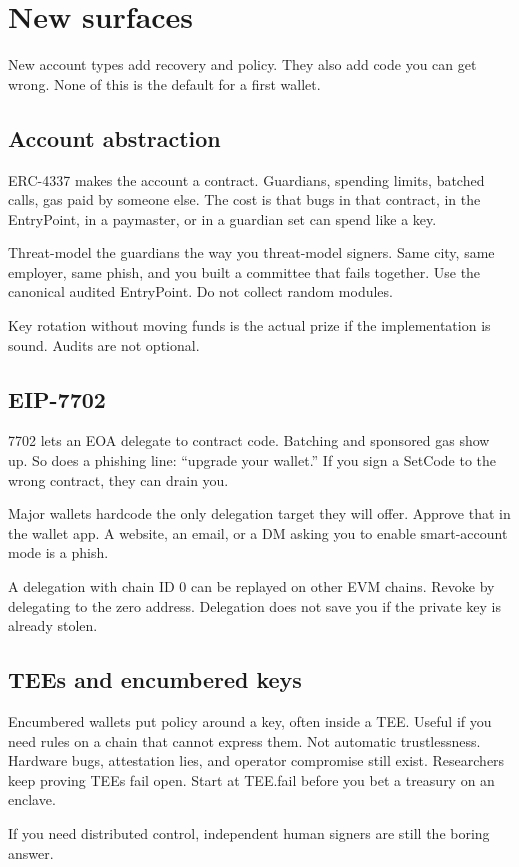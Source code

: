 \chapter{New surfaces}

New account types add recovery and policy. They also add
code you can get wrong. None of this is the default for
a first wallet.

\section{Account abstraction}

ERC-4337 makes the account a contract. Guardians,
spending limits, batched calls, gas paid by someone
else. The cost is that bugs in that contract, in the
EntryPoint, in a paymaster, or in a guardian set can
spend like a key.

Threat-model the guardians the way you threat-model
signers. Same city, same employer, same phish, and you
built a committee that fails together. Use the canonical
audited EntryPoint. Do not collect random modules.

Key rotation without moving funds is the actual prize if
the implementation is sound. Audits are not optional.

\section{EIP-7702}

7702 lets an EOA delegate to contract code. Batching and
sponsored gas show up. So does a phishing line: ``upgrade
your wallet.'' If you sign a SetCode to the wrong
contract, they can drain you.

Major wallets hardcode the only delegation target they
will offer. Approve that in the wallet app. A website, an
email, or a DM asking you to enable smart-account mode
is a phish.

A delegation with chain ID 0 can be replayed on other
EVM chains. Revoke by delegating to the zero address.
Delegation does not save you if the private key is
already stolen.

\section{TEEs and encumbered keys}

Encumbered wallets put policy around a key, often inside
a TEE. Useful if you need rules on a chain that cannot
express them. Not automatic trustlessness. Hardware
bugs, attestation lies, and operator compromise still
exist. Researchers keep proving TEEs fail open. Start at
TEE.fail before you bet a treasury on an enclave.

If you need distributed control, independent human
signers are still the boring answer.

